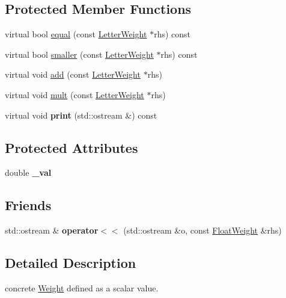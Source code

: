 \subsection*{Protected Member Functions}
\begin{DoxyCompactItemize}
\item 
virtual bool \mbox{\hyperlink{group__weight_gaaa895d17971bdd11c3ecddb9d701ac0a}{equal}} (const \mbox{\hyperlink{classLetterWeight}{Letter\+Weight}} $\ast$rhs) const
\item 
virtual bool \mbox{\hyperlink{group__weight_ga89e27d308aeaadbc11621ae9a6e839b3}{smaller}} (const \mbox{\hyperlink{classLetterWeight}{Letter\+Weight}} $\ast$rhs) const
\item 
virtual void \mbox{\hyperlink{group__weight_ga987ee2a0704f046a9be6e2456d56df7c}{add}} (const \mbox{\hyperlink{classLetterWeight}{Letter\+Weight}} $\ast$rhs)
\item 
virtual void \mbox{\hyperlink{group__weight_ga16591d6a01c98477ccd57deadf8d4738}{mult}} (const \mbox{\hyperlink{classLetterWeight}{Letter\+Weight}} $\ast$rhs)
\item 
virtual void {\bfseries print} (std\+::ostream \&) const
\end{DoxyCompactItemize}
\subsection*{Protected Attributes}
\begin{DoxyCompactItemize}
\item 
\mbox{\label{classFloatWeight_a379227ff21946891cf58783ece9c30f3}} 
double {\bfseries \+\_\+val}
\end{DoxyCompactItemize}
\subsection*{Friends}
\begin{DoxyCompactItemize}
\item 
\mbox{\label{classFloatWeight_a28da9ceeeef71d7da863914db5247228}} 
std\+::ostream \& {\bfseries operator$<$$<$} (std\+::ostream \&o, const \mbox{\hyperlink{classFloatWeight}{Float\+Weight}} \&rhs)
\end{DoxyCompactItemize}


\subsection{Detailed Description}
concrete \mbox{\hyperlink{classWeight}{Weight}} defined as a scalar value. 



